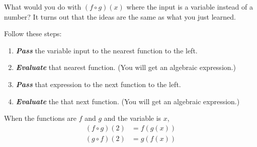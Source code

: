 \documentclass[fleqn,letterpaper,12pt,printwatermark=false]{memoir}
\begin{document}
\begin{myLesson}[][2]
    What would you do with
    $(f \circ g)(x)$
    where the input is a variable instead of a number?
    It turns out that the ideas are the same as what you just learned.
\end{myLesson}

\begin{myKeyConcepts}
    Follow these steps:
    \begin{enumerate}
        \item {\bfseries\itshape Pass} the variable input to the nearest function to the left.
        \item {\bfseries\itshape Evaluate} that nearest function. (You will get an algebraic expression.)
        \item {\bfseries\itshape Pass} that expression to the next function to the left. 
        \item {\bfseries\itshape Evaluate} the that next function. (You will get an algebraic expression.)
    \end{enumerate}
    When the functions are $f$ and $g$ and the variable is $x$,
    \begin{align*}
        (f \circ g)(2) &= f(g(x)) \\
        (g \circ f)(2) &= g(f(x))
    \end{align*}
\end{myKeyConcepts}





  
\end{document}
